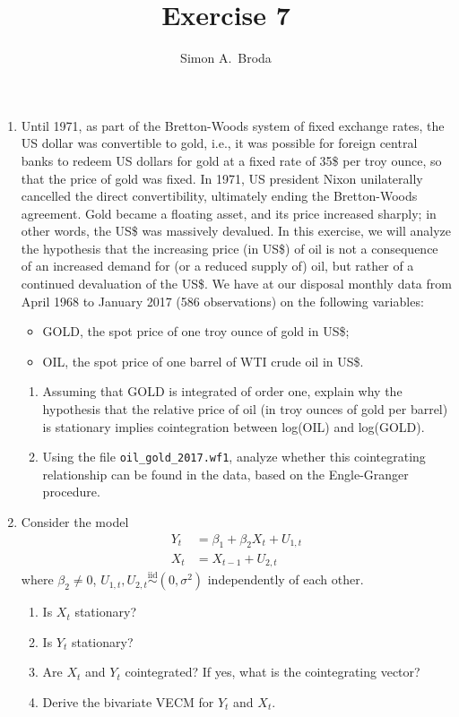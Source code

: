 \documentclass[11pt, a4paper]{article}
\begin{document}
\title{Exercise 7}
\author{Simon A.\ Broda}
\date{}
\maketitle

\begin{enumerate}

\item Until 1971, as part of the Bretton-Woods system of fixed exchange rates, the US dollar was convertible to gold, i.e., it was possible for foreign central banks to redeem US dollars for gold at a fixed rate of 35\$ per troy ounce, so that the price of gold was fixed. In 1971, US president Nixon unilaterally cancelled the direct convertibility, ultimately ending the Bretton-Woods agreement. Gold became a floating asset, and its price increased sharply; in other words, the US\$ was massively devalued. In this exercise, we will analyze the hypothesis that the increasing price (in US\$) of oil is not a consequence of an increased demand for (or a reduced supply of) oil, but rather of a continued devaluation of the US\$. We have at our disposal monthly data from April 1968 to January 2017 (586 observations) on the following variables:
\begin{itemize}
\item GOLD, the spot price of one troy ounce of gold in US\$;
\item OIL, the spot price of one barrel of WTI crude oil in US\$.
\end{itemize}
\begin{enumerate}
\item Assuming that GOLD is integrated of order one, explain why the hypothesis that the relative price of oil (in troy ounces of gold per barrel) is stationary implies cointegration between log(OIL) and log(GOLD).
\item Using the file \verb+oil_gold_2017.wf1+, analyze whether this cointegrating relationship can be found in the data, based on the Engle-Granger procedure.
\end{enumerate}
\item
Consider the model
\begin{align*}
Y_t&=\beta_1 +\beta_2 X_t+U_{1,t}\\
X_t&=X_{t-1}+U_{2,t}
\end{align*}
where $\beta_2\neq0$, $U_{1,t},U_{2,t}\stackrel{\mathrm{iid}}{\sim}(0,\sigma^2)$ independently of each other.
\begin{enumerate}
\item Is $X_t$ stationary?
\item Is $Y_t$ stationary?
\item Are $X_t$ and $Y_t$ cointegrated? If yes, what is the cointegrating vector?
\item Derive the bivariate VECM for $Y_t$ and $X_t$.
\end{enumerate}





\end{enumerate}
\end{document}
